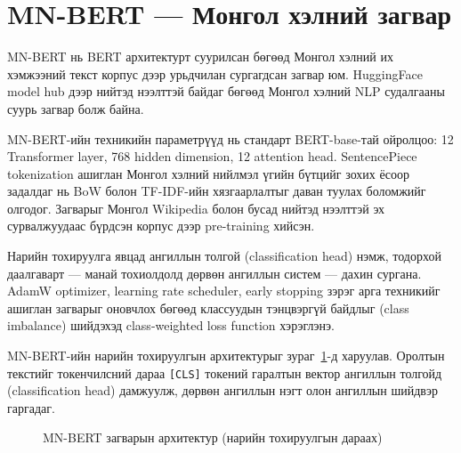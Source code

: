 \section{MN-BERT --- Монгол хэлний загвар}

MN-BERT нь BERT архитектурт суурилсан бөгөөд Монгол хэлний их хэмжээний текст
корпус дээр урьдчилан сургагдсан загвар юм. HuggingFace model hub дээр нийтэд
нээлттэй байдаг бөгөөд Монгол хэлний NLP судалгааны суурь загвар болж байна.

MN-BERT-ийн техникийн параметрүүд нь стандарт BERT-base-тай ойролцоо: 12
Transformer layer, 768 hidden dimension, 12 attention head. SentencePiece
tokenization ашиглан Монгол хэлний нийлмэл үгийн бүтцийг зохих ёсоор задалдаг
нь BoW болон TF-IDF-ийн хязгаарлалтыг даван туулах боломжийг олгодог. Загварыг
Монгол Wikipedia болон бусад нийтэд нээлттэй эх сурвалжуудаас бүрдсэн корпус
дээр pre-training хийсэн.

Нарийн тохируулга явцад ангиллын толгой (classification head) нэмж, тодорхой даалгаварт
--- манай тохиолдолд дөрвөн ангиллын систем --- дахин сургана. AdamW optimizer,
learning rate scheduler, early stopping зэрэг арга техникийг ашиглан загварыг
оновчлох бөгөөд классуудын тэнцвэргүй байдлыг (class imbalance) шийдэхэд
class-weighted loss function хэрэглэнэ.

MN-BERT-ийн нарийн тохируулгын архитектурыг зураг~\ref{fig:mnbert-arch}-д харуулав.
Оролтын текстийг токенчилсний дараа \texttt{[CLS]} токений гаралтын вектор
ангиллын толгойд (classification head) дамжуулж, дөрвөн ангиллын нэгт
олон ангиллын шийдвэр гаргадаг.

\begin{figure}[H]
\centering
{}
\caption{MN-BERT загварын архитектур (нарийн тохируулгын дараах)}
\label{fig:mnbert-arch}
\end{figure}

